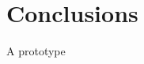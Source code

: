 \documentclass[letterpaper, 10 pt]{IEEEtran}
\begin{document}
\section{Conclusions}\label{sec:Conclusions}

A prototype


   

\end{document}
